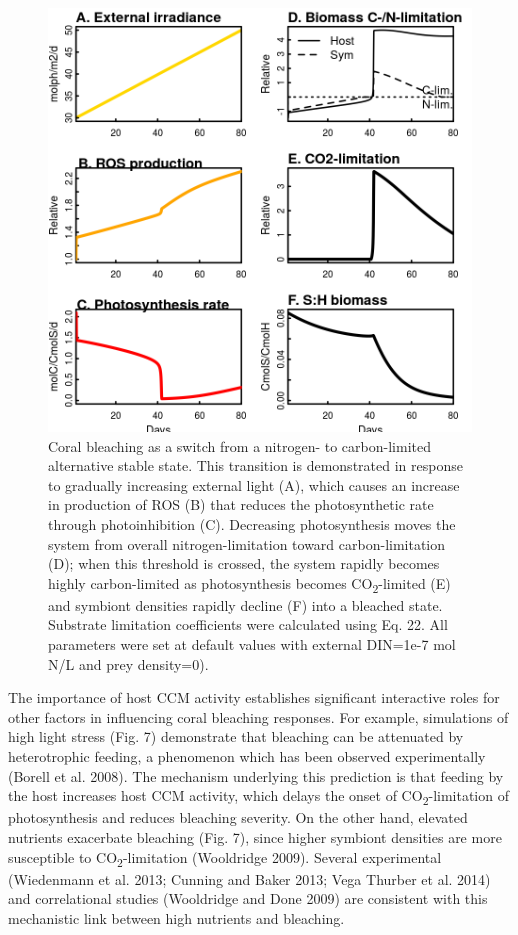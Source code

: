 \documentclass[]{elsarticle} %
\makeatletter
\def\maxwidth{\ifdim\Gin@nat@width>\linewidth\linewidth
\else\Gin@nat@width\fi}
\let\Oldincludegraphics\includegraphics
\renewcommand{\includegraphics}[1]{\Oldincludegraphics[width=\maxwidth]{#1}}
\makeatother
\begin{document}
\begin{figure}[htbp]
\centering
\includegraphics{../img/Fig6.png}
\caption{Coral bleaching as a switch from a nitrogen- to carbon-limited
alternative stable state. This transition is demonstrated in response to
gradually increasing external light (A), which causes an increase in
production of ROS (B) that reduces the photosynthetic rate through
photoinhibition (C). Decreasing photosynthesis moves the system from
overall nitrogen-limitation toward carbon-limitation (D); when this
threshold is crossed, the system rapidly becomes highly carbon-limited
as photosynthesis becomes CO\textsubscript{2}-limited (E) and symbiont
densities rapidly decline (F) into a bleached state. Substrate
limitation coefficients were calculated using Eq. 22. All parameters
were set at default values with external DIN=1e-7 mol N/L and prey
density=0).}
\end{figure}

The importance of host CCM activity establishes significant interactive
roles for other factors in influencing coral bleaching responses. For
example, simulations of high light stress (Fig. 7) demonstrate that
bleaching can be attenuated by heterotrophic feeding, a phenomenon which
has been observed experimentally (Borell et al. 2008). The mechanism
underlying this prediction is that feeding by the host increases host
CCM activity, which delays the onset of CO\textsubscript{2}-limitation
of photosynthesis and reduces bleaching severity. On the other hand,
elevated nutrients exacerbate bleaching (Fig. 7), since higher symbiont
densities are more susceptible to CO\textsubscript{2}-limitation
(Wooldridge 2009). Several experimental (Wiedenmann et al. 2013; Cunning
and Baker 2013; Vega Thurber et al. 2014) and correlational studies
(Wooldridge and Done 2009) are consistent with this mechanistic link
between high nutrients and bleaching.
\end{document}
